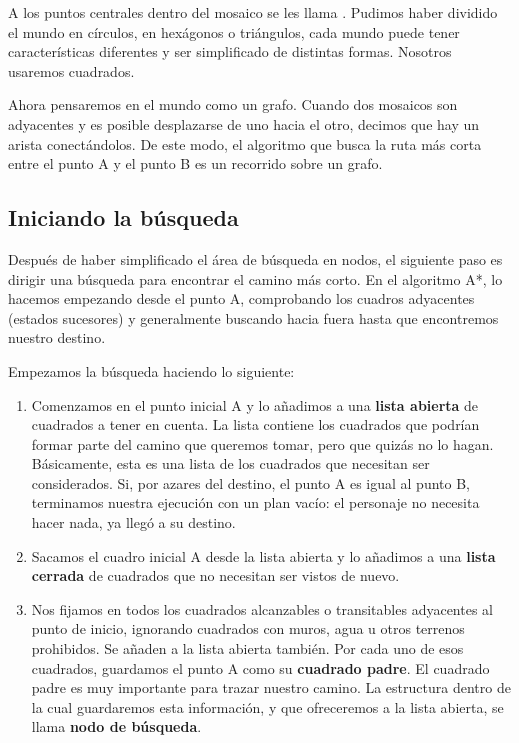 A los puntos centrales dentro del mosaico se les llama . Pudimos haber dividido el mundo en círculos, en hexágonos o triángulos, cada mundo puede tener características diferentes y ser simplificado de distintas formas.  Nosotros usaremos cuadrados.

Ahora pensaremos en el mundo como un grafo.  Cuando dos mosaicos son adyacentes y es posible desplazarse de uno hacia el otro, decimos que hay un arista conectándolos.  De este modo, el algoritmo que busca la ruta más corta entre el punto A y el punto B es un recorrido sobre un grafo.

\subsection{Iniciando la b\'usqueda}

Después de haber simplificado el área de búsqueda en nodos, el siguiente paso es dirigir una búsqueda para encontrar el camino más corto. En el algoritmo A*, lo hacemos empezando desde el punto A, comprobando los cuadros adyacentes (estados sucesores) y generalmente buscando hacia fuera hasta que encontremos nuestro destino.

\noindent Empezamos la búsqueda haciendo lo siguiente:

\begin{enumerate}
  \item Comenzamos en el punto inicial A y lo añadimos a una \textbf{lista abierta} de cuadrados a tener en cuenta. La lista contiene los cuadrados que podrían formar parte del camino que queremos tomar, pero que quizás no lo hagan. Básicamente, esta es una lista de los cuadrados que necesitan ser considerados. Si, por azares del destino, el punto A es igual al punto B, terminamos nuestra ejecución con un plan vacío: el personaje no necesita hacer nada, ya llegó a su destino.
  
  \item Sacamos el cuadro inicial A desde la lista abierta y lo añadimos a una \textbf{lista cerrada} de cuadrados que no necesitan ser vistos de nuevo.
  
  \item Nos fijamos en todos los cuadrados alcanzables o transitables adyacentes al punto de inicio, ignorando cuadrados con muros, agua u otros terrenos prohibidos. Se añaden a la lista abierta también. Por cada uno de esos cuadrados, guardamos el punto A como su \textbf{cuadrado padre}. El cuadrado padre es muy importante para trazar nuestro camino.  La estructura dentro de la cual guardaremos esta información, y que ofreceremos a la lista abierta, se llama \textbf{nodo de búsqueda}.
\end{enumerate}

